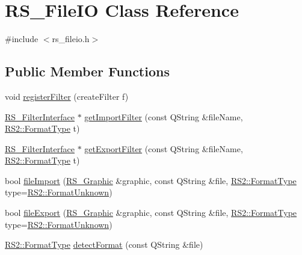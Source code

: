 \hypertarget{classRS__FileIO}{\section{R\-S\-\_\-\-File\-I\-O Class Reference}
\label{classRS__FileIO}
}


{\ttfamily \#include $<$rs\-\_\-fileio.\-h$>$}

\subsection*{Public Member Functions}
\begin{DoxyCompactItemize}
\item 
void \hyperlink{classRS__FileIO_a4be16cddaf87130f1c05bb9ba77e30e0}{register\-Filter} (create\-Filter f)
\item 
\hyperlink{classRS__FilterInterface}{R\-S\-\_\-\-Filter\-Interface} $\ast$ \hyperlink{classRS__FileIO_a540df4bdf4630f7b125e417e0d2fd274}{get\-Import\-Filter} (const Q\-String \&file\-Name, \hyperlink{classRS2_a077a6c94c9a0ab9962c4d4a612c7189b}{R\-S2\-::\-Format\-Type} t)
\item 
\hyperlink{classRS__FilterInterface}{R\-S\-\_\-\-Filter\-Interface} $\ast$ \hyperlink{classRS__FileIO_a564db5a8d9347df7bdf300ae35ed7044}{get\-Export\-Filter} (const Q\-String \&file\-Name, \hyperlink{classRS2_a077a6c94c9a0ab9962c4d4a612c7189b}{R\-S2\-::\-Format\-Type} t)
\item 
bool \hyperlink{classRS__FileIO_a1b193d836d3251acce0372f9bc5d0037}{file\-Import} (\hyperlink{classRS__Graphic}{R\-S\-\_\-\-Graphic} \&graphic, const Q\-String \&file, \hyperlink{classRS2_a077a6c94c9a0ab9962c4d4a612c7189b}{R\-S2\-::\-Format\-Type} type=\hyperlink{classRS2_a077a6c94c9a0ab9962c4d4a612c7189babbd9ecffa4b1eb72a46357317ef44a43}{R\-S2\-::\-Format\-Unknown})
\item 
bool \hyperlink{classRS__FileIO_a2d7aaa953402523c1942536d23f001c4}{file\-Export} (\hyperlink{classRS__Graphic}{R\-S\-\_\-\-Graphic} \&graphic, const Q\-String \&file, \hyperlink{classRS2_a077a6c94c9a0ab9962c4d4a612c7189b}{R\-S2\-::\-Format\-Type} type=\hyperlink{classRS2_a077a6c94c9a0ab9962c4d4a612c7189babbd9ecffa4b1eb72a46357317ef44a43}{R\-S2\-::\-Format\-Unknown})
\item 
\hyperlink{classRS2_a077a6c94c9a0ab9962c4d4a612c7189b}{R\-S2\-::\-Format\-Type} \hyperlink{classRS__FileIO_a2474f9254d85a287e35420d0a6c3f35e}{detect\-Format} (const Q\-String \&file)
\end{DoxyCompactItemize}
